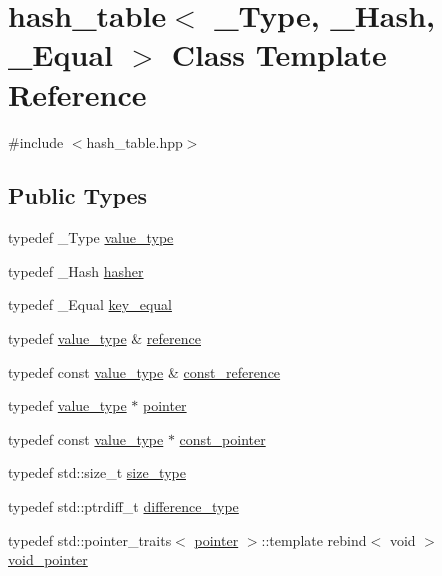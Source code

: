 \hypertarget{classhash__table}{}\section{hash\+\_\+table$<$ \+\_\+\+Type, \+\_\+\+Hash, \+\_\+\+Equal $>$ Class Template Reference}
\label{classhash__table}


{\ttfamily \#include $<$hash\+\_\+table.\+hpp$>$}

\subsection*{Public Types}
\begin{DoxyCompactItemize}
\item 
typedef \+\_\+\+Type \hyperlink{classhash__table_a536a4f7db0e47e35283f8e04ea72e88c}{value\+\_\+type}
\item 
typedef \+\_\+\+Hash \hyperlink{classhash__table_a50374ab474440525f6739d9e45a851f9}{hasher}
\item 
typedef \+\_\+\+Equal \hyperlink{classhash__table_a0261fc20ffaacd3a8b3f4562dd631beb}{key\+\_\+equal}
\item 
typedef \hyperlink{classhash__table_a536a4f7db0e47e35283f8e04ea72e88c}{value\+\_\+type} \& \hyperlink{classhash__table_a92ee06d8c071e7a5b41861d2622e02de}{reference}
\item 
typedef const \hyperlink{classhash__table_a536a4f7db0e47e35283f8e04ea72e88c}{value\+\_\+type} \& \hyperlink{classhash__table_a84b60c6fc08ecba763d5e3cfa7065e8d}{const\+\_\+reference}
\item 
typedef \hyperlink{classhash__table_a536a4f7db0e47e35283f8e04ea72e88c}{value\+\_\+type} $\ast$ \hyperlink{classhash__table_ad9e0d75b1e6756dc449ba917383d0dee}{pointer}
\item 
typedef const \hyperlink{classhash__table_a536a4f7db0e47e35283f8e04ea72e88c}{value\+\_\+type} $\ast$ \hyperlink{classhash__table_a8f09397b7443438bc50e7f6bfc9be9d6}{const\+\_\+pointer}
\item 
typedef std\+::size\+\_\+t \hyperlink{classhash__table_a8d85f5b55ee3116e6d40c1de62e62368}{size\+\_\+type}
\item 
typedef std\+::ptrdiff\+\_\+t \hyperlink{classhash__table_a7f48994c34ddc1f8a19ffa7dc3821b40}{difference\+\_\+type}
\item 
typedef std\+::pointer\+\_\+traits$<$ \hyperlink{classhash__table_ad9e0d75b1e6756dc449ba917383d0dee}{pointer} $>$\+::template rebind$<$ void $>$ \hyperlink{classhash__table_a46df0d3f55f71d07f275abebec698098}{void\+\_\+pointer}

\end{DoxyCompactItemize}
